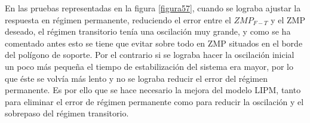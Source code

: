 En las pruebas representadas en la figura \ref{figura57}, cuando se lograba ajustar la respuesta en régimen permanente, reduciendo el error entre el $ZMP_{F-T}$ y el ZMP deseado, el régimen transitorio tenía una oscilación muy grande, y como se ha comentado antes esto se tiene que evitar sobre todo en ZMP situados en el borde del polígono de soporte. Por el contrario si se lograba hacer la oscilación inicial un poco más pequeña el tiempo de estabilización del sistema era mayor, por lo que éste se volvía más lento y no se lograba reducir el error del régimen permanente. Es por ello que se hace necesario la mejora del modelo LIPM, tanto para eliminar el error de régimen permanente como para reducir la oscilación y el sobrepaso del régimen transitorio.

